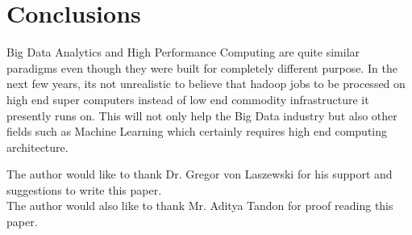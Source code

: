 \documentclass[sigconf]{acmart}
\begin{document}
\section{Conclusions}

Big Data Analytics and High Performance Computing are quite similar paradigms even though they were built for completely different purpose. In the next few years, its not unrealistic to believe that hadoop jobs to be processed on high end super computers instead of low end commodity infrastructure it presently runs on. This will not only help the Big Data industry but also other fields such as Machine Learning which certainly requires high end computing architecture. 


\appendix

\begin{acks}

 The author would like to thank Dr. Gregor von Laszewski for his support and suggestions to write this paper.
 \\
 The author would also like to thank Mr. Aditya Tandon for proof reading this paper.
\\
\end{acks}


 
\end{document}
